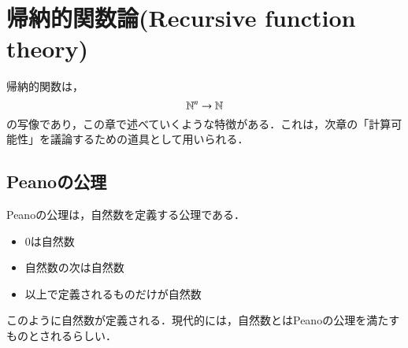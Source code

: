 \chapter{帰納的関数論(Recursive function theory)}
帰納的関数は，
\[
 \mathbb{N} ^n \rightarrow \mathbb{N}
\]
の写像であり，この章で述べていくような特徴がある．これは，次章の「計算可
能性」を議論するための道具として用いられる．

\section{Peanoの公理}
Peanoの公理は，自然数を定義する公理である．
\begin{itemize}
 \item 0は自然数
 \item 自然数の次は自然数
 \item 以上で定義されるものだけが自然数
\end{itemize}
このように自然数が定義される．現代的には，自然数とはPeanoの公理を満たす
ものとされるらしい．


